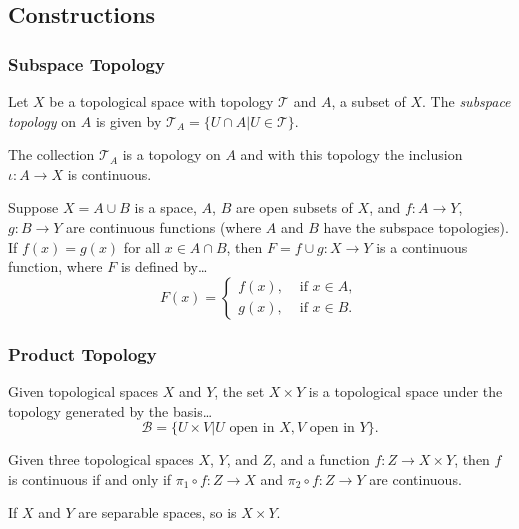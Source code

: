 \subsection{Constructions}\label{topologicalconstructions}

\subsubsection{Subspace Topology}\label{subspacetopology}
Let $X$ be a topological space with topology $\mathcal{T}$ and $A$, a subset of $X$. The \emph{subspace topology} on $A$ is given by $\mathcal{T}_A = \{ U \cap A | U \in \mathcal{T} \}$.

\begin{proposition}
The collection $\mathcal{T}_A$ is a topology on $A$ and with this topology the inclusion $\iota : A \rightarrow X$ is continuous.
\end{proposition}

\begin{proposition}
Suppose $X = A \cup B$ is a space, $A$, $B$ are open subsets of $X$, and $f: A \rightarrow Y$, $g : B \rightarrow Y$ are continuous functions (where $A$ and $B$ have the subspace topologies).
If $f(x) = g(x)$ for all $x \in A \cap B$,
then $F = f \cup g : X \rightarrow Y$ is a continuous function, where $F$ is defined by\dots
\[
F(x) = \begin{cases}
f(x), & \textrm{ if } x \in A,\\
g(x), & \textrm{ if } x \in B.
\end{cases}
\]
\end{proposition}

\subsubsection{Product Topology}\label{producttopology}
Given topological spaces $X$ and $Y$, the set $X \times Y$ is a topological space under the topology generated by the basis\dots
$$\mathcal{B} = \{ U \times V | U \textrm{ open in } X,V \textrm{ open in } Y \}.$$

\begin{proposition}
Given three topological spaces $X$, $Y$, and $Z$, and a function $f : Z \rightarrow X \times Y$, then $f$ is continuous if and only if
$\pi_1 \circ f : Z \rightarrow X$ and $\pi_2 \circ f : Z \rightarrow Y$ are continuous.
\end{proposition}

\begin{proposition}
If $X$ and $Y$ are separable spaces, so is $X \times Y$.
\end{proposition}

